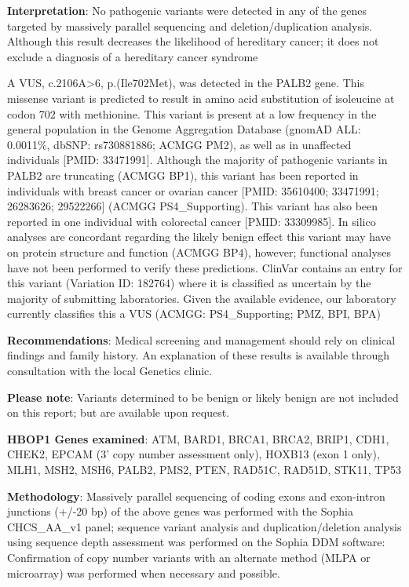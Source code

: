 \documentclass[10pt,letterpaper]{extarticle}
\begin{document}
{\bf Interpretation}: No pathogenic variants were detected in any of the genes targeted by massively parallel sequencing and deletion/duplication analysis. Although this result decreases the likelihood of hereditary cancer; it does not exclude a diagnosis of a hereditary cancer syndrome

A VUS, c.2106A>6, p.(Ile702Met), was detected in the PALB2 gene. This missense variant is predicted to result in amino acid substitution of isoleucine at codon 702 with methionine. This variant is present at a low frequency in the general population in the Genome Aggregation Database (gnomAD ALL: 0.0011\%, dbSNP: rs730881886; ACMGG PM2), as well as in unaffected individuals [PMID: 33471991]. Although the majority of pathogenic variants in PALB2 are truncating (ACMGG BP1), this variant has been reported in individuals with breast cancer or ovarian cancer [PMID: 35610400; 33471991; 26283626; 29522266] (ACMGG PS4\_Supporting). This variant has also been reported in one individual with colorectal cancer [PMID: 33309985]. In silico analyses are concordant regarding the likely benign effect this variant may have on protein structure and function (ACMGG BP4), however; functional analyses have not been performed to verify these predictions. ClinVar contains an entry for this variant (Variation ID: 182764) where it is classified as uncertain by the majority of submitting laboratories. Given the available evidence, our laboratory currently classifies this a VUS (ACMGG: PS4\_Supporting; PMZ, BPI, BPA) 

{\bf Recommendations}: Medical screening and management should rely on clinical findings and family history. An explanation of these results is available through consultation with the local Genetics clinic.

{\bf Please note}: Variants determined to be benign or likely benign are not included on this report; but are available upon request.

{\bf HBOP1 Genes examined}: ATM, BARD1, BRCA1, BRCA2, BRIP1, CDH1, CHEK2, EPCAM (3' copy number assessment only), HOXB13 (exon 1 only), MLH1, MSH2, MSH6, PALB2, PMS2, PTEN, RAD51C, RAD51D, STK11, TP53 

{\bf Methodology}: Massively parallel sequencing of coding exons and exon-intron junctions (+/-20 bp) of the above genes was performed with the Sophia CHCS\_AA\_v1 panel; sequence variant analysis and duplication/deletion analysis using sequence depth assessment was performed on the Sophia DDM software: Confirmation of copy number variants with an alternate method (MLPA or microarray) was performed when necessary and possible. 
\end{document}

